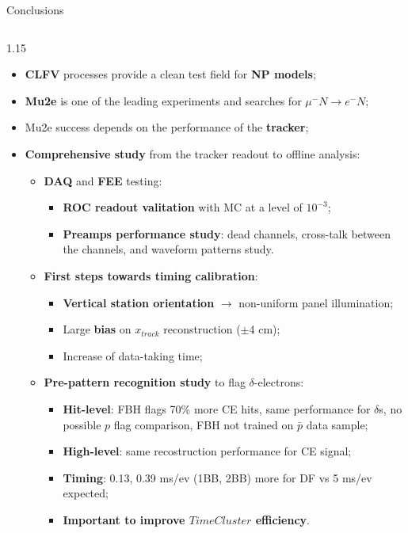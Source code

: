 \documentclass{beamer}
\begin{document}
\begin{frame}{Conclusions}
\vspace{-4mm}
\begin{columns}
\begin{column}{1.15\framewidth}
 \setlength{\leftmargini}{1.2em}
    \begin{itemize}
\item \textbf{CLFV} processes provide a clean test field for \textbf{NP models};
\item \textbf{Mu2e} is one of the leading experiments and searches for $\mu^- N \rightarrow e^- N$;
\item Mu2e success depends on the performance of the \textbf{tracker};
    \item \textbf{Comprehensive study} from the tracker readout to offline analysis:
   \begin{itemize}
      \vspace{0.7mm}
   \item \textbf{DAQ} and \textbf{FEE} testing:
   \vspace{0.4mm}
      \begin{itemize}
          
     
    \item \textbf{ROC readout valitation} with MC at a level of $10^{-3}$;
    \item \textbf{Preamps performance study}: dead channels, 
cross-talk between the channels, and waveform patterns study.
 \end{itemize}
    \vspace{0.7mm}
 \item \textbf{First steps towards timing calibration}:
  \vspace{0.4mm}
 \begin{itemize}
     \item \textbf{Vertical station orientation} $\rightarrow$ non-uniform panel illumination;
     \item Large \textbf{bias} on $x_{track}$ reconstruction ($\pm$4 cm);
     \item Increase of data-taking time;
 \end{itemize}
   \vspace{0.7mm}
 \item \textbf{Pre-pattern recognition study} to flag $\delta$-electrons:
  \vspace{0.4mm}
  \begin{itemize}
  \item \textbf{Hit-level}: FBH flags 70\% more CE hits, same performance for $\delta$s, no possible $p$ flag comparison, FBH not trained on $\bar{p}$ data sample;
  \item \textbf{High-level}: same recostruction performance for CE signal;
  \item  \textbf{Timing}: 0.13, 0.39 ms/ev (1BB, 2BB) more for DF vs 5 ms/ev expected;
     \item \textbf{Important to improve $TimeCluster$ efficiency}.
 \end{itemize}
   \end{itemize}
    \end{itemize}
    \end{column}
\end{columns}


\end{frame}
\end{document}
